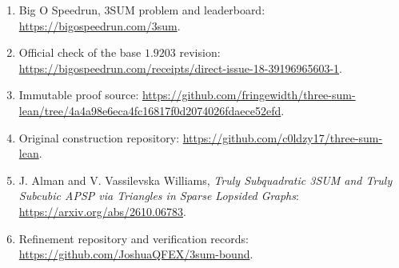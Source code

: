 \documentclass[11pt,a4paper]{article}
\begin{document}
\begingroup
\small
\begin{enumerate}
\setlength{\itemsep}{2pt}
\setlength{\parsep}{0pt}
\setlength{\parskip}{0pt}
\item Big O Speedrun, 3SUM problem and leaderboard:
\url{https://bigospeedrun.com/3sum}.
\item Official check of the base $1.9203$ revision:
\url{https://bigospeedrun.com/receipts/direct-issue-18-39196965603-1}.
\item Immutable proof source:
\url{https://github.com/fringewidth/three-sum-lean/tree/4a4a98e6eca4fc16817f0d2074026fdaece52efd}.
\item Original construction repository:
\url{https://github.com/c0ldzy17/three-sum-lean}.
\item J. Alman and V. Vassilevska Williams, \emph{Truly Subquadratic 3SUM
and Truly Subcubic APSP via Triangles in Sparse Lopsided Graphs}:
\url{https://arxiv.org/abs/2610.06783}.
\item Refinement repository and verification records:
\url{https://github.com/JoshuaQFEX/3sum-bound}.
\end{enumerate}
\endgroup
\end{document}
